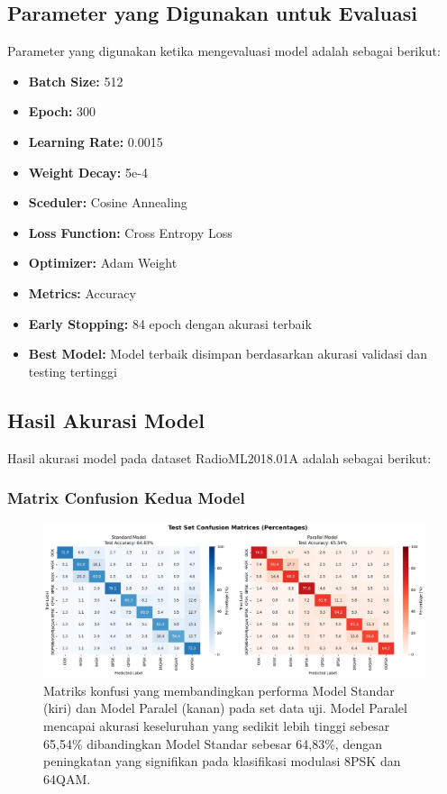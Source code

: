 \documentclass{article}
\begin{document}
\subsection{Parameter yang Digunakan untuk Evaluasi}
Parameter yang digunakan ketika mengevaluasi model adalah sebagai berikut: 
\begin{itemize}
    \item \textbf{Batch Size:} 512
    \item \textbf{Epoch:} 300 
    \item \textbf{Learning Rate:} 0.0015 
    \item \textbf{Weight Decay:} 5e-4 
    \item \textbf{Sceduler:} Cosine Annealing
    \item \textbf{Loss Function:} Cross Entropy Loss
    \item \textbf{Optimizer:} Adam Weight 
    \item \textbf{Metrics:} Accuracy 
    \item \textbf{Early Stopping:} 84 epoch dengan akurasi terbaik 
    \item \textbf{Best Model:} Model terbaik disimpan berdasarkan akurasi validasi dan testing tertinggi 
\end{itemize} 

\subsection{Hasil Akurasi Model}
Hasil akurasi model pada dataset RadioML2018.01A adalah sebagai berikut:
\subsubsection{Matrix Confusion Kedua Model}
\begin{figure}[ht]
    \centerline{\includegraphics[width=1.0\textwidth,height=0.4\textheight]{Hasil/confusion_matrix_with_percentage.png}}
    \caption{Matriks konfusi yang membandingkan performa Model Standar (kiri) dan Model Paralel (kanan) pada set data uji. Model Paralel mencapai akurasi keseluruhan yang sedikit lebih tinggi sebesar 65,54\% dibandingkan Model Standar sebesar 64,83\%, dengan peningkatan yang signifikan pada klasifikasi modulasi 8PSK dan 64QAM.}
    \label{fig:Figure 1}
\end{figure}
\end{document}
